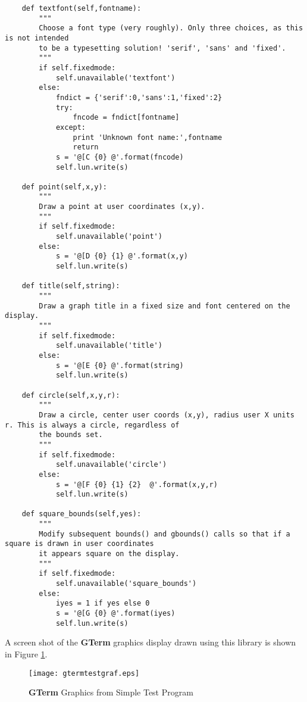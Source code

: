 \documentclass[a4paper,twoside,11pt]{article}
\makeatletter
\def\maxwidth{%
  \ifdim\Gin@nat@width>\linewidth
    \linewidth
  \else
    \Gin@nat@width
  \fi
}
\makeatother
\begin{document}
\begin{lstlisting}
    def textfont(self,fontname):
        """
        Choose a font type (very roughly). Only three choices, as this is not intended
        to be a typesetting solution! 'serif', 'sans' and 'fixed'.
        """
        if self.fixedmode:
            self.unavailable('textfont')
        else:        
            fndict = {'serif':0,'sans':1,'fixed':2}
            try:
                fncode = fndict[fontname]
            except:
                print 'Unknown font name:',fontname
                return
            s = '@[C {0} @'.format(fncode)
            self.lun.write(s)

    def point(self,x,y):
        """
        Draw a point at user coordinates (x,y).
        """
        if self.fixedmode:
            self.unavailable('point')
        else:         
            s = '@[D {0} {1} @'.format(x,y)
            self.lun.write(s)       

    def title(self,string):
        """
        Draw a graph title in a fixed size and font centered on the display.
        """
        if self.fixedmode:
            self.unavailable('title')
        else:     
            s = '@[E {0} @'.format(string)
            self.lun.write(s)

    def circle(self,x,y,r):
        """
        Draw a circle, center user coords (x,y), radius user X units r. This is always a circle, regardless of
        the bounds set.
        """
        if self.fixedmode:
            self.unavailable('circle')
        else:         
            s = '@[F {0} {1} {2}  @'.format(x,y,r)
            self.lun.write(s)

    def square_bounds(self,yes):
        """
        Modify subsequent bounds() and gbounds() calls so that if a square is drawn in user coordinates
        it appears square on the display.
        """
        if self.fixedmode:
            self.unavailable('square_bounds')
        else:        
            iyes = 1 if yes else 0
            s = '@[G {0} @'.format(iyes)
            self.lun.write(s)
\end{lstlisting}

\noindent A screen shot of the \textbf{GTerm} graphics display drawn using this library is shown in Figure \ref{fig:graf1}.
\begin{figure}
	\centering
		\texttt{[image: gtermtestgraf.eps]}
	\caption{\textbf{GTerm} Graphics from Simple Test Program}
	\label{fig:graf1}
\end{figure}
\end{document}
